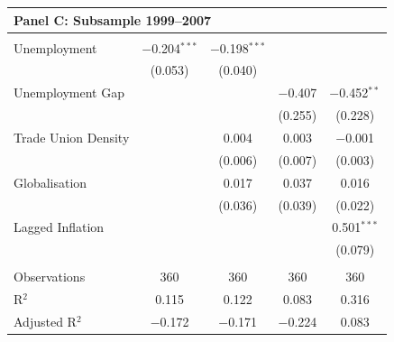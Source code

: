 \documentclass[preprint,10pt,authoryear]{elsarticle}
\begin{document}
\begin{table}[H]
\begin{minipage}[t]{0.48\textwidth}
{\begin{tabular}{lcccc}
\multicolumn{5}{l}{\textbf{Panel C: Subsample 1999--2007}} \\
\hline\\[-1.8ex]
Unemployment        & $-$0.204$^{***}$ & $-$0.198$^{***}$ &                  &                  \\
                    & (0.053)          & (0.040)          &                  &                  \\
Unemployment Gap    &                  &                  & $-$0.407         & $-$0.452$^{**}$  \\
                    &                  &                  & (0.255)          & (0.228)          \\
Trade Union Density &                  & 0.004            & 0.003            & $-$0.001         \\
                    &                  & (0.006)          & (0.007)          & (0.003)          \\
Globalisation       &                  & 0.017            & 0.037            & 0.016            \\
                    &                  & (0.036)          & (0.039)          & (0.022)          \\
Lagged Inflation    &                  &                  &                  & 0.501$^{***}$    \\
                    &                  &                  &                  & (0.079)          \\
\hline\\[-1.8ex]
Observations     & 360      & 360      & 360      & 360   \\
R$^{2}$          & 0.115    & 0.122    & 0.083    & 0.316 \\
Adjusted R$^{2}$ & $-$0.172 & $-$0.171 & $-$0.224 & 0.083 \\


\end{tabular}}
\end{minipage}
\end{table}
\end{document}
